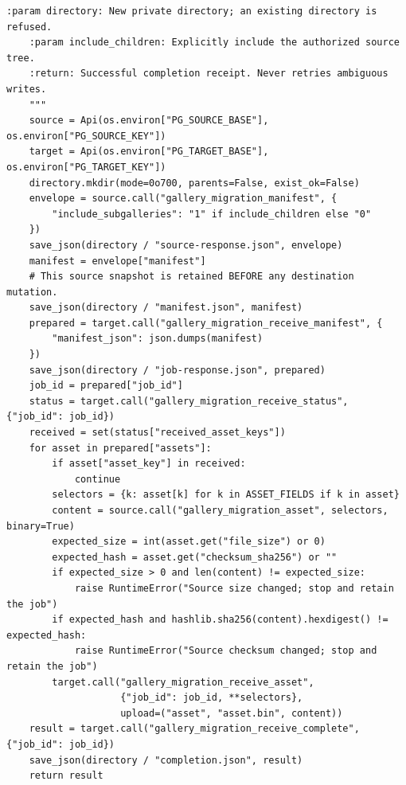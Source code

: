 \documentclass[11pt,a4paper]{article}
\begin{document}
\begin{lstlisting}[language={}]
    :param directory: New private directory; an existing directory is refused.
    :param include_children: Explicitly include the authorized source tree.
    :return: Successful completion receipt. Never retries ambiguous writes.
    """
    source = Api(os.environ["PG_SOURCE_BASE"], os.environ["PG_SOURCE_KEY"])
    target = Api(os.environ["PG_TARGET_BASE"], os.environ["PG_TARGET_KEY"])
    directory.mkdir(mode=0o700, parents=False, exist_ok=False)
    envelope = source.call("gallery_migration_manifest", {
        "include_subgalleries": "1" if include_children else "0"
    })
    save_json(directory / "source-response.json", envelope)
    manifest = envelope["manifest"]
    # This source snapshot is retained BEFORE any destination mutation.
    save_json(directory / "manifest.json", manifest)
    prepared = target.call("gallery_migration_receive_manifest", {
        "manifest_json": json.dumps(manifest)
    })
    save_json(directory / "job-response.json", prepared)
    job_id = prepared["job_id"]
    status = target.call("gallery_migration_receive_status", {"job_id": job_id})
    received = set(status["received_asset_keys"])
    for asset in prepared["assets"]:
        if asset["asset_key"] in received:
            continue
        selectors = {k: asset[k] for k in ASSET_FIELDS if k in asset}
        content = source.call("gallery_migration_asset", selectors, binary=True)
        expected_size = int(asset.get("file_size") or 0)
        expected_hash = asset.get("checksum_sha256") or ""
        if expected_size > 0 and len(content) != expected_size:
            raise RuntimeError("Source size changed; stop and retain the job")
        if expected_hash and hashlib.sha256(content).hexdigest() != expected_hash:
            raise RuntimeError("Source checksum changed; stop and retain the job")
        target.call("gallery_migration_receive_asset",
                    {"job_id": job_id, **selectors},
                    upload=("asset", "asset.bin", content))
    result = target.call("gallery_migration_receive_complete", {"job_id": job_id})
    save_json(directory / "completion.json", result)
    return result



\end{lstlisting}
\end{document}
